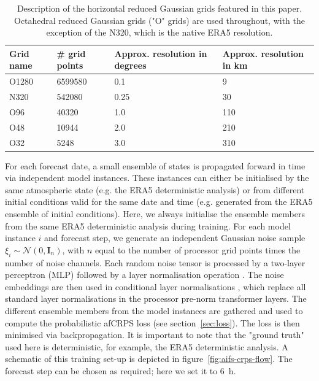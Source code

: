 \documentclass{article}
\begin{document}
\begin{table}[htbp]
\centering
\begin{tabular}{|p{2cm}|p{2cm}|p{5cm}|p{4cm}|}
\hline
\textbf{Grid name} & \textbf{\# grid points} & \textbf{Approx. resolution in degrees} & \textbf{Approx. resolution in km} \\ 
\hline
O1280 & \num{6599580} & 0.1 & 9 \\
\hline
N320 & \num{542080} & 0.25 & 30 \\
\hline
O96 & \num{40320} & 1.0 & 110 \\
\hline
O48 & \num{10944} & 2.0 & 210 \\
\hline
O32 & \num{5248} & 3.0 & 310 \\
\hline
\end{tabular}
\caption{Description of the horizontal reduced Gaussian grids featured in this paper. Octahedral reduced Gaussian grids ("O" grids) are used throughout, with the exception of the N320, which is the native ERA5 resolution.}
\label{table:grids}
\end{table}

For each forecast date, a small ensemble of states is propagated forward in time via independent model instances. These instances can either be initialised by the same atmospheric state (e.g. the ERA5 deterministic analysis) or from different initial conditions valid for the same date and time (e.g. generated from the ERA5 ensemble of initial conditions).
Here, we always initialise the ensemble members from the same ERA5 deterministic analysis during training.
For each model instance $i$ and forecast step, we generate an independent Gaussian noise sample ${\xi_i} \sim \mathcal{N}(0, \mathbf{I}_n)$, with $n$ equal to the number of processor grid points times the number of noise channels. Each random noise tensor is processed by a two-layer perceptron (MLP) followed by a layer normalisation operation \citep{ba2016layernormalization}. The noise embeddings are then used in conditional layer normalisations \citep{chen2021adaspeechadaptivetextspeech}, which replace all standard layer normalisations in the processor pre-norm transformer layers. The different ensemble members from the model instances are gathered and used to compute the probabilistic afCRPS loss (see section~\ref{sec:loss}). The loss is then minimised via backpropagation. It is important to note that the "ground truth" used here is deterministic, for example, the ERA5 deterministic analysis.
A schematic of this training set-up is depicted in figure~\ref{fig:aifs-crps-flow}. The forecast step can be chosen as required; here we set it to 6~h.
\end{document}
